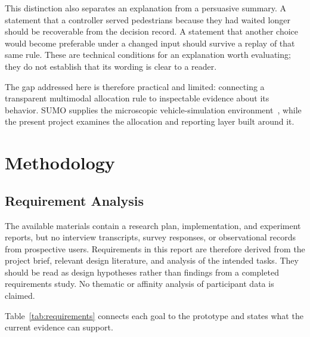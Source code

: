 \documentclass[sigconf]{acmart}
\begin{document}
This distinction also separates an explanation from a persuasive
summary. A statement that a controller served pedestrians because
they had waited longer should be recoverable from the decision
record. A statement that another choice would become preferable
under a changed input should survive a replay of that same rule.
These are technical conditions for an explanation worth evaluating;
they do not establish that its wording is clear to a reader.

The gap addressed here is therefore practical and limited: connecting
a transparent multimodal allocation rule to inspectable evidence about
its behavior. SUMO supplies the microscopic vehicle-simulation
environment~\cite{sumo2018}, while the present project examines the
allocation and reporting layer built around it.

\section{Methodology}
\subsection{Requirement Analysis}
The available materials contain a research plan, implementation, and
experiment reports, but no interview transcripts, survey responses, or
observational records from prospective users. Requirements in this
report are therefore derived from the project brief, relevant design
literature, and analysis of the intended tasks. They should be read as
design hypotheses rather than findings from a completed requirements
study. No thematic or affinity analysis of participant data is claimed.

Table~\ref{tab:requirements} connects each goal to the prototype and
states what the current evidence can support.
\end{document}
